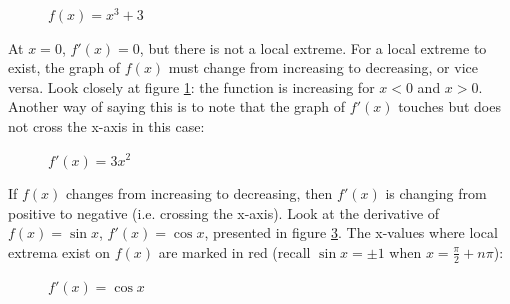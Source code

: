 \begin{figure}[H]
	\centering
	\caption{$f(x) = x^3+3$}
	\label{fig:nonextrema}
\end{figure}


At $x=0$, $f'(x)=0$, but there is not a local extreme. For a local extreme to 
exist, the graph of $f(x)$ must change from increasing to decreasing, or vice 
versa. Look closely at figure \ref{fig:nonextrema}: the function is increasing 
for $x<0$ and $x>0$. Another way of saying this is to note that the graph of 
$f'(x)$ touches but does not cross the x-axis in this case:

\begin{figure}[H]
	\centering
	\caption{$f'(x) = 3x^2$}
	\label{fig:touch}
\end{figure}


If $f(x)$ changes from increasing to decreasing, then $f'(x)$ is changing from 
positive to negative (i.e. crossing the x-axis). Look at the derivative of 
$f(x) = \sin{x}$, $f'(x)=\cos{x}$, presented in figure \ref{fig:fprimecos}. 
The x-values where local extrema exist on $f(x)$ are marked in red (recall 
$\sin{x} = \pm 1$ when $x=\frac{\pi}{2} + n\pi$):

\begin{figure}  %
    \centering
    \caption{$f'(x) = \cos x$}
    \label{fig:fprimecos}
\end{figure}


